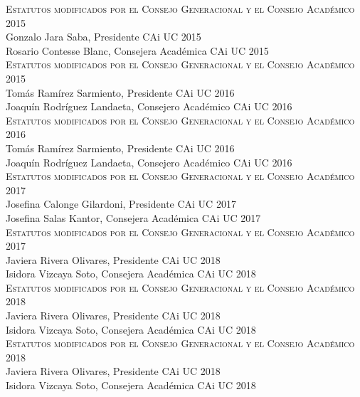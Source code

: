 \documentclass[letterpaper,11pt]{article}
\theoremstyle{plain}
\begin{document}
\begin{sloppypar}
		\textsc{Estatutos modificados por el Consejo Generacional y el Consejo Académico 2015}\\
		Gonzalo Jara Saba, Presidente CAi UC 2015\\
		Rosario Contesse Blanc, Consejera Académica CAi UC 2015\\

		\textsc{Estatutos modificados por el Consejo Generacional y el Consejo Académico 2015}\\
		Tomás Ramírez Sarmiento, Presidente CAi UC 2016\\
		Joaquín Rodríguez Landaeta, Consejero Académico CAi UC 2016\\

		\textsc{Estatutos modificados por el Consejo Generacional y el Consejo Académico 2016}\\
		Tomás Ramírez Sarmiento, Presidente CAi UC 2016\\
		Joaquín Rodríguez Landaeta, Consejero Académico CAi UC 2016\\

		\textsc{Estatutos modificados por el Consejo Generacional y el Consejo Académico 2017}\\
		Josefina Calonge Gilardoni, Presidente CAi UC 2017\\
		Josefina Salas Kantor, Consejera Académica CAi UC 2017\\

		\textsc{Estatutos modificados por el Consejo Generacional y el Consejo Académico 2017}\\
		Javiera Rivera Olivares, Presidente CAi UC 2018\\
		Isidora Vizcaya Soto, Consejera Académica CAi UC 2018\\

		\textsc{Estatutos modificados por el Consejo Generacional y el Consejo Académico 2018}\\
		Javiera Rivera Olivares, Presidente CAi UC 2018\\
		Isidora Vizcaya Soto, Consejera Académica CAi UC 2018\\

		\textsc{Estatutos modificados por el Consejo Generacional y el Consejo Académico 2018}\\
		Javiera Rivera Olivares, Presidente CAi UC 2018\\
		Isidora Vizcaya Soto, Consejera Académica CAi UC 2018\\


	\end{sloppypar}
\end{document}
